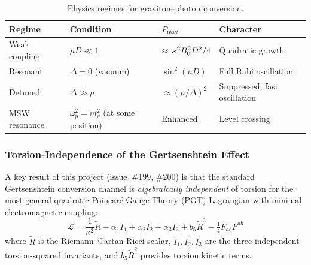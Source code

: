 \begin{table}[htbp]
\centering
\caption{Physics regimes for graviton--photon conversion.}
\label{tab:gert-regimes}
\begin{tabular}{@{}llll@{}}
\toprule
Regime & Condition & $P_\mathrm{max}$ & Character \\
\midrule
Weak coupling    & $\mu D \ll 1$                              & $\approx \varkappa^2 B_0^2 D^2/4$ & Quadratic growth \\
Resonant         & $\Delta = 0$ (vacuum)                      & $\sin^2(\mu D)$                    & Full Rabi oscillation \\
Detuned          & $\Delta \gg \mu$                           & $\approx (\mu/\Delta)^2$           & Suppressed, fast oscillation \\
MSW resonance    & $\omega_p^2 = m_g^2$ (at some position)    & Enhanced                           & Level crossing \\
\bottomrule
\end{tabular}
\end{table}

\subsubsection{Torsion-Independence of the Gertsenshtein Effect}
\label{subsec:torsion-independence}

A key result of this project (issue~\#199, \#200) is that the standard
Gertsenshtein conversion channel is \emph{algebraically independent} of torsion
for the most general quadratic Poincar\'{e} Gauge Theory (PGT) Lagrangian with
minimal electromagnetic coupling:
\begin{equation}
  \mathcal{L} = \frac{1}{\kappa^2}\widetilde{R}
    + \alpha_1 I_1 + \alpha_2 I_2 + \alpha_3 I_3
    + b_5 \widetilde{R}^2
    - \tfrac{1}{4} F_{ab} F^{ab}
  \label{eq:pgt-em-lagrangian}
\end{equation}
where $\widetilde{R}$ is the Riemann--Cartan Ricci scalar, $I_1, I_2, I_3$ are
the three independent torsion-squared invariants, and $b_5\widetilde{R}^2$
provides torsion kinetic terms.


